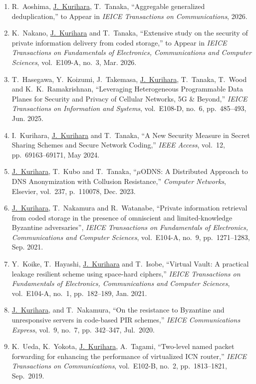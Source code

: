 \begin{enumerate}
  \item R.~Aoshima, \underline{J.~Kurihara}, T.~Tanaka, ``Aggregable generalized deduplication,'' to Appear in \textit{IEICE Transactions on Communications}, 2026.
  \item K.~Nakano, \underline{J.~Kurihara} and T.~Tanaka, ``Extensive study on the security of private information delivery from coded storage,'' to Appear in \textit{IEICE Transactions on Fundamentals of Electronics, Communications and Computer Sciences}, vol.~E109-A, no.~3, Mar. 2026.
  \item T.~Hasegawa, Y.~Koizumi, J.~Takemasa, \underline{J.~Kurihara}, T.~Tanaka, T.~Wood and K.~K.~Ramakrishnan, ``Leveraging Heterogeneous Programmable Data Planes for Security and Privacy of Cellular Networks, 5G \& Beyond,'' \textit{IEICE Transactions on Information and Systems}, vol.~E108-D, no.~6, pp.~485--493, Jun. 2025.
  \item I.~Kurihara, \underline{J.~Kurihara} and T.~Tanaka, ``A New Security Measure in Secret Sharing Schemes and Secure Network Coding,'' \textit{IEEE Access}, vol.~12, pp.~69163--69171, May 2024.
  \item \underline{J.~Kurihara}, T.~Kubo and T.~Tanaka, ``$\mu$ODNS: A Distributed Approach to DNS Anonymization with Collusion Resistance,'' \textit{Computer Networks}, Elsevier, vol.~237, p.~110078, Dec. 2023.
  \item \underline{J.~Kurihara}, T.~Nakamura and R.~Watanabe, ``Private information retrieval from coded storage in the presence of omniscient and limited-knowledge Byzantine adversaries'', \textit{IEICE Transactions on Fundamentals of Electronics, Communications and Computer Sciences}, vol.~E104-A, no.~9, pp.~1271--1283, Sep. 2021.
  \item Y.~Koike, T.~Hayashi, \underline{J.~Kurihara} and T.~Isobe, ``Virtual Vault: A practical leakage resilient scheme using space-hard ciphers,'' \textit{IEICE Transactions on Fundamentals of Electronics, Communications and Computer Sciences}, vol.~E104-A, no.~1, pp.~182--189, Jan. 2021.
  \item \underline{J.~Kurihara}, and T.~Nakamura, ``On the resistance to Byzantine and unresponsive servers in code-based PIR schemes,'' \textit{IEICE Communications Express}, vol.~9, no.~7, pp.~342--347, Jul.~2020.
  \item K.~Ueda, K.~Yokota, \underline{J.~Kurihara}, A.~Tagami, ``Two-level named packet forwarding for enhancing the performance of virtualized ICN router,'' \textit{IEICE Transactions on Communications}, vol.~E102-B, no.~2, pp.~1813--1821, Sep.~2019.

\end{enumerate}
